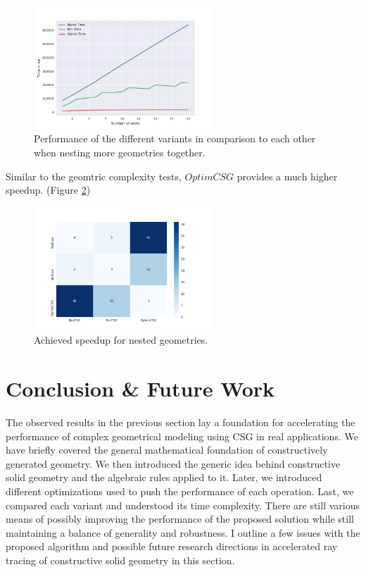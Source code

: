 \documentclass[a4paper,11pt,oneside]{article}
\begin{document}
\begin{figure}[H]
	\centering
	\includegraphics[width=0.6\textwidth]{section5/plots/test_nesting.png}
	\caption{Performance of the different variants in comparison to each other when nesting more geometries together.}
	\label{sec5.2:test_nesting}
\end{figure}

Similar to the geomtric complexity tests, $OptimCSG$ provides a much higher speedup. (Figure \ref{sec5.1:heatmap_nesting})

\begin{figure}[H]
	\centering
	\includegraphics[width=0.6\textwidth]{section5/plots/nesting_speedup.png}
	\caption{Achieved speedup for nested geometries.}
	\label{sec5.1:heatmap_nesting}
\end{figure}


\section{Conclusion \& Future Work}


The observed results in the previous section lay a foundation for accelerating the performance of complex geometrical modeling using CSG in real applications. We have briefly covered the general mathematical foundation of constructively generated geometry. We then introduced the generic idea behind constructive solid geometry and the algebraic rules applied to it. Later, we introduced different optimizations used to push the performance of each operation. Last, we compared each variant and understood its time complexity. There are still various means of possibly improving the performance of the proposed solution while still maintaining a balance of generality and robustness. I outline a few issues with the proposed algorithm and possible future research directions in accelerated ray tracing of constructive solid geometry in this section.
\end{document}
